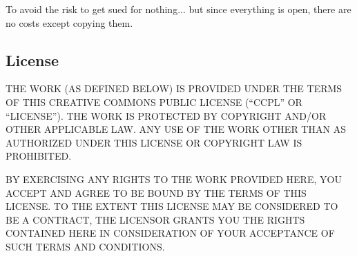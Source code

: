 \documentclass[letterpaper,10pt,english]{manual}
\begin{document}
To avoid the risk to get sued for nothing... but since everything is
open, there are no costs except copying them.


\subsection{License}

THE WORK (AS DEFINED BELOW) IS PROVIDED UNDER THE TERMS OF THIS CREATIVE COMMONS PUBLIC LICENSE (``CCPL'' OR ``LICENSE''). THE WORK IS PROTECTED BY COPYRIGHT AND/OR OTHER APPLICABLE LAW. ANY USE OF THE WORK OTHER THAN AS AUTHORIZED UNDER THIS LICENSE OR COPYRIGHT LAW IS PROHIBITED.

BY EXERCISING ANY RIGHTS TO THE WORK PROVIDED HERE, YOU ACCEPT AND AGREE TO BE BOUND BY THE TERMS OF THIS LICENSE. TO THE EXTENT THIS LICENSE MAY BE CONSIDERED TO BE A CONTRACT, THE LICENSOR GRANTS YOU THE RIGHTS CONTAINED HERE IN CONSIDERATION OF YOUR ACCEPTANCE OF SUCH TERMS AND CONDITIONS.
\end{document}
